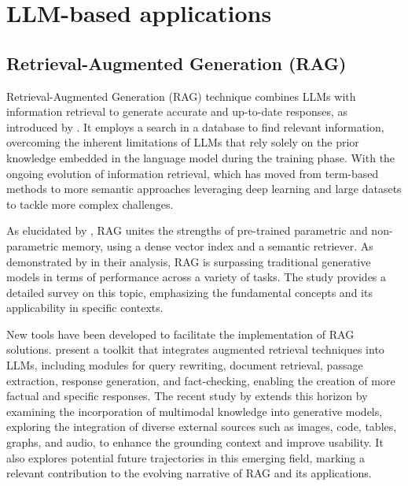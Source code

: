     \section{LLM-based applications}

        \subsection{Retrieval-Augmented Generation (RAG)} 

            Retrieval-Augmented Generation (RAG) technique combines LLMs with information retrieval to generate accurate and up-to-date responses, as introduced by \citet{Lewis2020}. It employs a search in a database to find relevant information, overcoming the inherent limitations of LLMs that rely solely on the prior knowledge embedded in the language model during the training phase. 
            With the ongoing evolution of information retrieval, which has moved from term-based methods to more semantic approaches leveraging deep learning and large datasets to tackle more complex challenges.
            
            As elucidated by \citet{Lewis2020}, RAG unites the strengths of pre-trained parametric and non-parametric memory, using a dense vector index and a semantic retriever. 
            As demonstrated by \citet{Li2022} in their analysis, RAG is surpassing traditional generative models in terms of performance across a variety of tasks. The study provides a detailed survey on this topic, emphasizing the fundamental concepts and its applicability in specific contexts.

            New tools have been developed to facilitate the implementation of RAG solutions. \citet{Liu2023} present a toolkit that integrates augmented retrieval techniques into LLMs, including modules for query rewriting, document retrieval, passage extraction, response generation, and fact-checking, enabling the creation of more factual and specific responses. The recent study by \citet{Zhao2023} extends this horizon by examining the incorporation of multimodal knowledge into generative models, exploring the integration of diverse external sources such as images, code, tables, graphs, and audio, to enhance the grounding context and improve usability. It also explores potential future trajectories in this emerging field, marking a relevant contribution to the evolving narrative of RAG and its applications.

